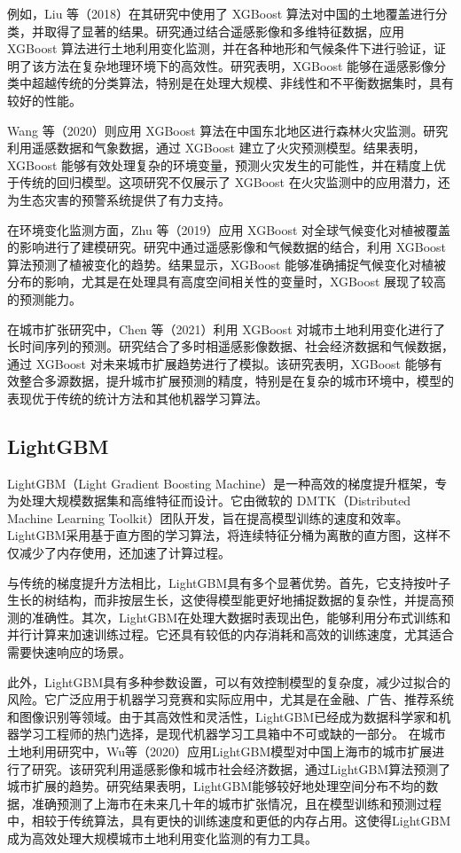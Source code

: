 \documentclass[AutoFakeBold]{LZUThesis-PgD&PhD}
\begin{document}
例如，Liu 等（2018）在其研究中使用了 XGBoost 算法对中国的土地覆盖进行分类，并取得了显著的结果\cite{liu2018}。研究通过结合遥感影像和多维特征数据，应用 XGBoost 算法进行土地利用变化监测，并在各种地形和气候条件下进行验证，证明了该方法在复杂地理环境下的高效性。研究表明，XGBoost 能够在遥感影像分类中超越传统的分类算法，特别是在处理大规模、非线性和不平衡数据集时，具有较好的性能。

Wang 等（2020）则应用 XGBoost 算法在中国东北地区进行森林火灾监测\cite{wang2020Y}。研究利用遥感数据和气象数据，通过 XGBoost 建立了火灾预测模型。结果表明，XGBoost 能够有效处理复杂的环境变量，预测火灾发生的可能性，并在精度上优于传统的回归模型。这项研究不仅展示了 XGBoost 在火灾监测中的应用潜力，还为生态灾害的预警系统提供了有力支持。

在环境变化监测方面，Zhu 等（2019）应用 XGBoost 对全球气候变化对植被覆盖的影响进行了建模研究\cite{zhu2019}。研究中通过遥感影像和气候数据的结合，利用 XGBoost 算法预测了植被变化的趋势。结果显示，XGBoost 能够准确捕捉气候变化对植被分布的影响，尤其是在处理具有高度空间相关性的变量时，XGBoost 展现了较高的预测能力。

在城市扩张研究中，Chen 等（2021）利用 XGBoost 对城市土地利用变化进行了长时间序列的预测\cite{chen2021}。研究结合了多时相遥感影像数据、社会经济数据和气候数据，通过 XGBoost 对未来城市扩展趋势进行了模拟。该研究表明，XGBoost 能够有效整合多源数据，提升城市扩展预测的精度，特别是在复杂的城市环境中，模型的表现优于传统的统计方法和其他机器学习算法。



\subsection{LightGBM}
	LightGBM（Light Gradient Boosting Machine）是一种高效的梯度提升框架，专为处理大规模数据集和高维特征而设计。它由微软的 DMTK（Distributed Machine Learning Toolkit）团队开发，旨在提高模型训练的速度和效率。LightGBM采用基于直方图的学习算法，将连续特征分桶为离散的直方图，这样不仅减少了内存使用，还加速了计算过程。
	
	与传统的梯度提升方法相比，LightGBM具有多个显著优势。首先，它支持按叶子生长的树结构，而非按层生长，这使得模型能更好地捕捉数据的复杂性，并提高预测的准确性。其次，LightGBM在处理大数据时表现出色，能够利用分布式训练和并行计算来加速训练过程。它还具有较低的内存消耗和高效的训练速度，尤其适合需要快速响应的场景。
	
	此外，LightGBM具有多种参数设置，可以有效控制模型的复杂度，减少过拟合的风险。它广泛应用于机器学习竞赛和实际应用中，尤其是在金融、广告、推荐系统和图像识别等领域。由于其高效性和灵活性，LightGBM已经成为数据科学家和机器学习工程师的热门选择，是现代机器学习工具箱中不可或缺的一部分。
	在城市土地利用研究中，Wu等（2020）应用LightGBM模型对中国上海市的城市扩展进行了研究\cite{wu2020}。该研究利用遥感影像和城市社会经济数据，通过LightGBM算法预测了城市扩展的趋势。研究结果表明，LightGBM能够较好地处理空间分布不均的数据，准确预测了上海市在未来几十年的城市扩张情况，且在模型训练和预测过程中，相较于传统算法，具有更快的训练速度和更低的内存占用。这使得LightGBM成为高效处理大规模城市土地利用变化监测的有力工具。
	
\end{document}
